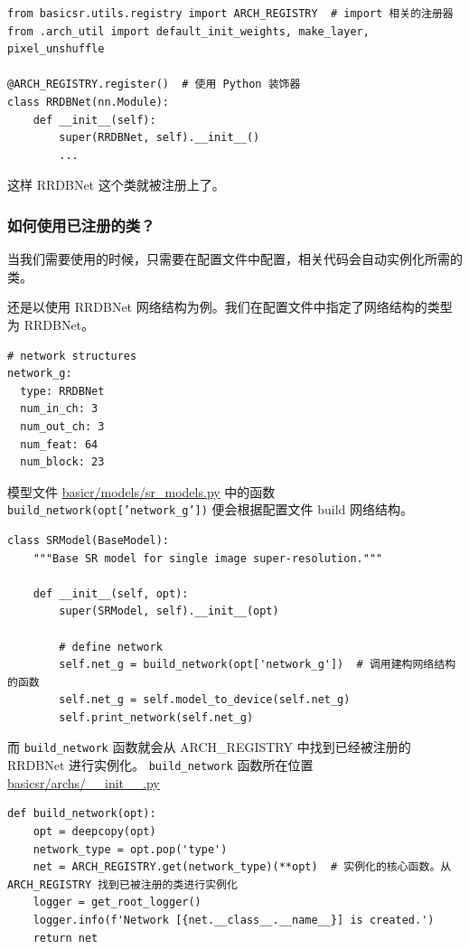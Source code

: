\documentclass[../main.tex]{subfiles}
\begin{document}
\begin{verbatim}
from basicsr.utils.registry import ARCH_REGISTRY  # import 相关的注册器
from .arch_util import default_init_weights, make_layer, pixel_unshuffle

@ARCH_REGISTRY.register()  # 使用 Python 装饰器
class RRDBNet(nn.Module):
    def __init__(self):
        super(RRDBNet, self).__init__()
        ...
\end{verbatim}

这样 RRDBNet 这个类就被注册上了。

\subsubsection{如何使用已注册的类？}\label{code_structure:how_to_use_registerd}

当我们需要使用的时候，只需要在配置文件中配置，相关代码会自动实例化所需的类。

还是以使用 RRDBNet 网络结构为例。我们在配置文件中指定了网络结构的类型为 RRDBNet。
\begin{verbatim}
# network structures
network_g:
  type: RRDBNet
  num_in_ch: 3
  num_out_ch: 3
  num_feat: 64
  num_block: 23
\end{verbatim}

模型文件 \href{https://github.com/XPixelGroup/BasicSR/blob/master/basicsr/models/sr_model.py}{basicr/models/sr\_models.py} 中的函数 \texttt{build\_network(opt['network\_g'])} 便会根据配置文件 build 网络结构。
\begin{verbatim}
class SRModel(BaseModel):
    """Base SR model for single image super-resolution."""

    def __init__(self, opt):
        super(SRModel, self).__init__(opt)

        # define network
        self.net_g = build_network(opt['network_g'])  # 调用建构网络结构的函数
        self.net_g = self.model_to_device(self.net_g)
        self.print_network(self.net_g)
\end{verbatim}

而 \texttt{build\_network} 函数就会从 ARCH\_REGISTRY 中找到已经被注册的 RRDBNet 进行实例化。 \texttt{build\_network} 函数所在位置 \href{https://github.com/XPixelGroup/BasicSR/blob/master/basicsr/archs/\_\_init\_\_.py}{basicsr/archs/\_\_init\_\_.py}

\begin{verbatim}
def build_network(opt):
    opt = deepcopy(opt)
    network_type = opt.pop('type')
    net = ARCH_REGISTRY.get(network_type)(**opt)  # 实例化的核心函数。从 ARCH_REGISTRY 找到已被注册的类进行实例化
    logger = get_root_logger()
    logger.info(f'Network [{net.__class__.__name__}] is created.')
    return net
\end{verbatim}
\end{document}
